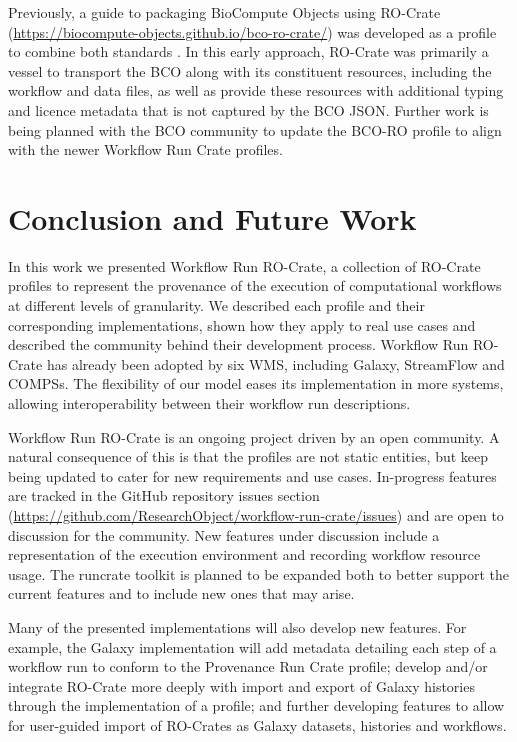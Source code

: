 \documentclass[10pt,letterpaper]{article}
\begin{document}
Previously, a guide to packaging BioCompute Objects using RO-Crate (\url{https://biocompute-objects.github.io/bco-ro-crate/}) was developed as a profile to combine both standards \cite{Soiland-Reyes 2021}.
In this early approach, RO-Crate was primarily a vessel to transport the BCO along with its constituent resources, including the workflow and data files, as well as provide these resources with additional typing and licence metadata that is not captured by the BCO JSON. 
Further work is being planned with the BCO community to update the BCO-RO profile to align with the newer Workflow Run Crate profiles. 

\hypertarget{conclusion}{%
\section{Conclusion and Future Work}\label{conclusion}}

In this work we presented Workflow Run RO-Crate, a collection of RO-Crate profiles to represent the provenance of the execution of computational workflows at different levels of granularity.
We described each profile and their corresponding implementations, shown how they apply to real use cases and described the community behind their development process.
Workflow Run RO-Crate has already been adopted by six WMS, including Galaxy, StreamFlow and COMPSs. The flexibility of our model eases its implementation in more systems, allowing interoperability between their workflow run descriptions.

Workflow Run RO-Crate is an ongoing project driven by an open community.
A natural consequence of this is that the profiles are not static entities, but keep being updated to cater for new requirements and use cases.
In-progress features are tracked in the GitHub repository issues section (\url{https://github.com/ResearchObject/workflow-run-crate/issues}) and are open to discussion for the community.
New features under discussion include a representation of the execution environment and recording workflow resource usage.
The runcrate toolkit is planned to be expanded both to better support the current features and to include new ones that may arise.

Many of the presented implementations will also develop new features. For example, the Galaxy implementation will add metadata detailing each step of a workflow run to conform to the Provenance Run Crate profile; develop and/or integrate RO-Crate more deeply with import and export of Galaxy histories through the implementation of a profile; and further developing features to allow for user-guided import of RO-Crates as Galaxy datasets, histories and workflows.
\end{document}
